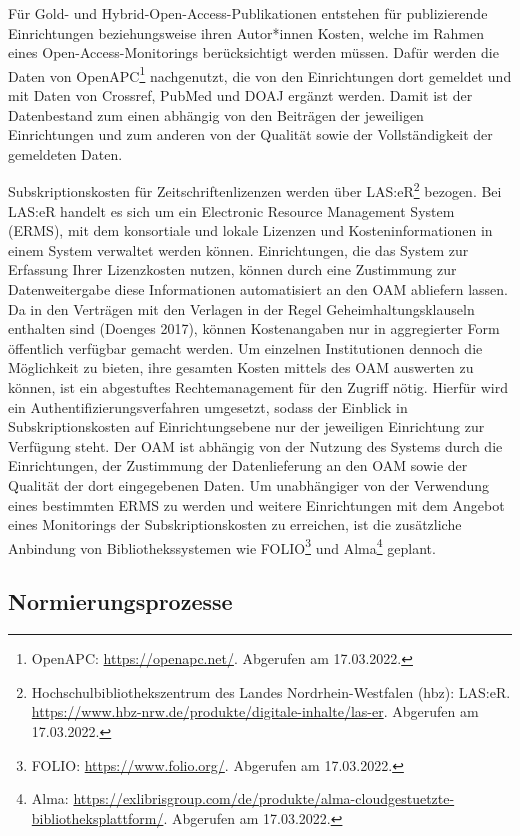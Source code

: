 \documentclass[a4paper,
fontsize=11pt,
oneside,
numbers=noperiodatend,
parskip=half-,
bibliography=totoc,
final
]{scrartcl}
\begin{document}
Für Gold- und Hybrid-Open-Access-Publikationen entstehen für
publizierende Einrichtungen beziehungsweise ihren Autor*innen Kosten,
welche im Rahmen eines Open-Access-Monitorings berücksichtigt werden
müssen. Dafür werden die Daten von OpenAPC\footnote{OpenAPC:
  \url{https://openapc.net/}. Abgerufen am 17.03.2022.} nachgenutzt, die
von den Einrichtungen dort gemeldet und mit Daten von Crossref, PubMed
und DOAJ ergänzt werden. Damit ist der Datenbestand zum einen abhängig
von den Beiträgen der jeweiligen Einrichtungen und zum anderen von der
Qualität sowie der Vollständigkeit der gemeldeten Daten.

Subskriptionskosten für Zeitschriftenlizenzen werden über
LAS:eR\footnote{Hochschulbibliothekszentrum des Landes
  Nordrhein-Westfalen (hbz): LAS:eR.
  \url{https://www.hbz-nrw.de/produkte/digitale-inhalte/las-er}.
  Abgerufen am 17.03.2022.} bezogen. Bei LAS:eR handelt es sich um ein
Electronic Resource Management System (ERMS), mit dem konsortiale und
lokale Lizenzen und Kosteninformationen in einem System verwaltet werden
können. Einrichtungen, die das System zur Erfassung Ihrer Lizenzkosten
nutzen, können durch eine Zustimmung zur Datenweitergabe diese
Informationen automatisiert an den OAM abliefern lassen. Da in den
Verträgen mit den Verlagen in der Regel Geheimhaltungsklauseln enthalten
sind (Doenges 2017), können Kostenangaben nur in aggregierter Form
öffentlich verfügbar gemacht werden. Um einzelnen Institutionen dennoch
die Möglichkeit zu bieten, ihre gesamten Kosten mittels des OAM
auswerten zu können, ist ein abgestuftes Rechtemanagement für den
Zugriff nötig. Hierfür wird ein Authentifizierungsverfahren umgesetzt,
sodass der Einblick in Subskriptionskosten auf Einrichtungsebene nur der
jeweiligen Einrichtung zur Verfügung steht. Der OAM ist abhängig von der
Nutzung des Systems durch die Einrichtungen, der Zustimmung der
Datenlieferung an den OAM sowie der Qualität der dort eingegebenen
Daten. Um unabhängiger von der Verwendung eines bestimmten ERMS zu
werden und weitere Einrichtungen mit dem Angebot eines Monitorings der
Subskriptionskosten zu erreichen, ist die zusätzliche Anbindung von
Bibliothekssystemen wie FOLIO\footnote{FOLIO:
  \url{https://www.folio.org/}. Abgerufen am 17.03.2022.} und
Alma\footnote{Alma:
  \url{https://exlibrisgroup.com/de/produkte/alma-cloudgestuetzte-bibliotheksplattform/}.
  Abgerufen am 17.03.2022.} geplant.

\hypertarget{normierungsprozesse}{%
\subsection{Normierungsprozesse}\label{normierungsprozesse}}
\end{document}
